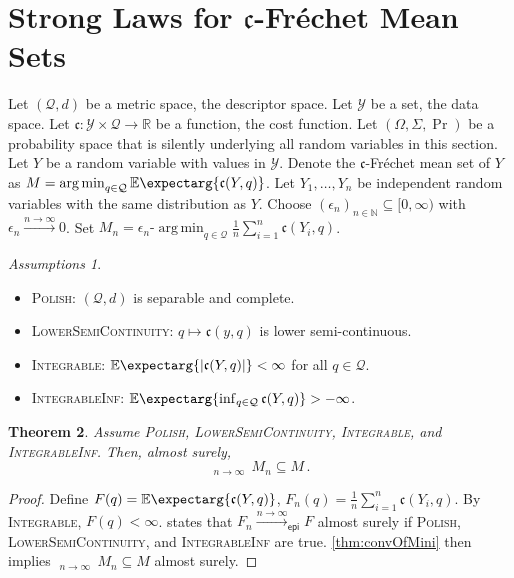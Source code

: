 \documentclass{scrartcl}
\renewcommand{\subset}{\subseteq}
\newcommand{\Ex}{\E\expectarg}
\newcommand*{\mc}[1]{\mathcal{#1}}
\newcommand*{\ms}[1]{\mathsf{#1}}
\newcommand*{\mf}[1]{\mathfrak{#1}}
\newcommand{\N}{\mathbb{N}}
\newcommand{\R}{\mathbb{R}}
\newcommand{\equationFullstop}{\, .}
\newcommand{\eqfs}{\equationFullstop}
\DeclareMathOperator*{\argmin}{arg\,min}
\DeclareMathOperator*{\outerlim}{lim\, \overline{sup}}
\theoremstyle{plain}\newtheorem{theorem}{Theorem}[section]
\theoremstyle{definition}
\theoremstyle{remark}
\newtheorem{assumptions}[theorem]{Assumptions}
\begin{document}
 \section{Strong Laws for $\mf c$-Fréchet Mean Sets}\label{sec:gen}
Let $(\mc Q, d)$ be a metric space, the descriptor space. Let $\mc Y$ be a set, the data space. Let $\mf c\colon \mc Y \times\mc Q \to \R$ be a function, the cost function. Let $(\Omega, \Sigma, \Pr)$ be a probability space that is silently underlying all random variables in this section. Let $Y$ be a random variable with values in $\mc Y$. Denote the $\mf c$-Fréchet mean set of $Y$ as $M = \argmin_{q\in\mc Q} \Ex{\mf c(Y, q)}$.
Let $Y_1, \dots, Y_n$ be independent random variables with the same distribution as $Y$.
Choose $(\epsilon_n)_{n\in\N}\subset [0,\infty)$ with $\epsilon_n \xrightarrow{n\to\infty}0$. Set $M_n = \epsilon_n\text{-}\argmin_{q\in\mc Q} \frac1n \sum_{i=1}^n \mf c(Y_i, q)$.
\begin{assumptions}\mbox{ }
\begin{itemize}
\item 
	\textsc{Polish}: 
	$(\mc Q, d)$ is separable and complete.
\item 
	\textsc{LowerSemiContinuity}: 
	$q \mapsto \mf c(y, q)$ is lower semi-continuous.
\item 
	\textsc{Integrable}: 
	$\Ex{\abs{\mf c(Y, q)}} < \infty$ for all $q\in\mc Q$.
\item 
	\textsc{IntegrableInf}: 
	$\Ex{\inf_{q \in \mc Q}\mf c(Y, q)} > - \infty$.
\end{itemize}
\end{assumptions}
\begin{theorem}\label{thm:epi}
	Assume \textsc{Polish}, \textsc{LowerSemiContinuity}, \textsc{Integrable}, and \textsc{IntegrableInf}.
	Then, almost surely,
	\begin{equation*}
		\outerlim_{n\to\infty}\, M_n \subset M
		\eqfs
	\end{equation*}
\end{theorem}
\begin{proof}
Define $F(q) = \Ex{\mf c(Y, q)}$, $F_n(q) = \frac1n\sum_{i=1}^n \mf c(Y_i, q)$. By \textsc{Integrable}, $F(q)<\infty$.
\cite[Theorem 1.1]{korf01} states that $F_n \xrightarrow{n\to\infty}_{\ms{epi}} F$ almost surely if \textsc{Polish}, \textsc{LowerSemiContinuity}, and \textsc{IntegrableInf} are true. \autoref{thm:convOfMini} then implies $\outerlim_{n\to\infty}\, M_n \subset M$ almost surely.
\end{proof}
\end{document}
